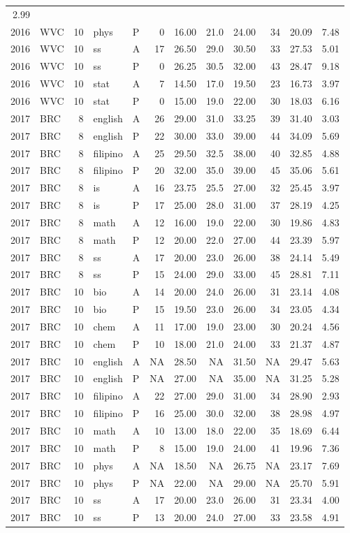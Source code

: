\documentclass[]{article}
\begin{document}
\begin{longtable}[]{@{}rlrllrrrrrrr@{}}
2.99\tabularnewline
2016 & WVC & 10 & phys & P & 0 & 16.00 & 21.0 & 24.00 & 34 & 20.09 &
7.48\tabularnewline
2016 & WVC & 10 & ss & A & 17 & 26.50 & 29.0 & 30.50 & 33 & 27.53 &
5.01\tabularnewline
2016 & WVC & 10 & ss & P & 0 & 26.25 & 30.5 & 32.00 & 43 & 28.47 &
9.18\tabularnewline
2016 & WVC & 10 & stat & A & 7 & 14.50 & 17.0 & 19.50 & 23 & 16.73 &
3.97\tabularnewline
2016 & WVC & 10 & stat & P & 0 & 15.00 & 19.0 & 22.00 & 30 & 18.03 &
6.16\tabularnewline
2017 & BRC & 8 & english & A & 26 & 29.00 & 31.0 & 33.25 & 39 & 31.40 &
3.03\tabularnewline
2017 & BRC & 8 & english & P & 22 & 30.00 & 33.0 & 39.00 & 44 & 34.09 &
5.69\tabularnewline
2017 & BRC & 8 & filipino & A & 25 & 29.50 & 32.5 & 38.00 & 40 & 32.85 &
4.88\tabularnewline
2017 & BRC & 8 & filipino & P & 20 & 32.00 & 35.0 & 39.00 & 45 & 35.06 &
5.61\tabularnewline
2017 & BRC & 8 & is & A & 16 & 23.75 & 25.5 & 27.00 & 32 & 25.45 &
3.97\tabularnewline
2017 & BRC & 8 & is & P & 17 & 25.00 & 28.0 & 31.00 & 37 & 28.19 &
4.25\tabularnewline
2017 & BRC & 8 & math & A & 12 & 16.00 & 19.0 & 22.00 & 30 & 19.86 &
4.83\tabularnewline
2017 & BRC & 8 & math & P & 12 & 20.00 & 22.0 & 27.00 & 44 & 23.39 &
5.97\tabularnewline
2017 & BRC & 8 & ss & A & 17 & 20.00 & 23.0 & 26.00 & 38 & 24.14 &
5.49\tabularnewline
2017 & BRC & 8 & ss & P & 15 & 24.00 & 29.0 & 33.00 & 45 & 28.81 &
7.11\tabularnewline
2017 & BRC & 10 & bio & A & 14 & 20.00 & 24.0 & 26.00 & 31 & 23.14 &
4.08\tabularnewline
2017 & BRC & 10 & bio & P & 15 & 19.50 & 23.0 & 26.00 & 34 & 23.05 &
4.34\tabularnewline
2017 & BRC & 10 & chem & A & 11 & 17.00 & 19.0 & 23.00 & 30 & 20.24 &
4.56\tabularnewline
2017 & BRC & 10 & chem & P & 10 & 18.00 & 21.0 & 24.00 & 33 & 21.37 &
4.87\tabularnewline
2017 & BRC & 10 & english & A & NA & 28.50 & NA & 31.50 & NA & 29.47 &
5.63\tabularnewline
2017 & BRC & 10 & english & P & NA & 27.00 & NA & 35.00 & NA & 31.25 &
5.28\tabularnewline
2017 & BRC & 10 & filipino & A & 22 & 27.00 & 29.0 & 31.00 & 34 & 28.90
& 2.93\tabularnewline
2017 & BRC & 10 & filipino & P & 16 & 25.00 & 30.0 & 32.00 & 38 & 28.98
& 4.97\tabularnewline
2017 & BRC & 10 & math & A & 10 & 13.00 & 18.0 & 22.00 & 35 & 18.69 &
6.44\tabularnewline
2017 & BRC & 10 & math & P & 8 & 15.00 & 19.0 & 24.00 & 41 & 19.96 &
7.36\tabularnewline
2017 & BRC & 10 & phys & A & NA & 18.50 & NA & 26.75 & NA & 23.17 &
7.69\tabularnewline
2017 & BRC & 10 & phys & P & NA & 22.00 & NA & 29.00 & NA & 25.70 &
5.91\tabularnewline
2017 & BRC & 10 & ss & A & 17 & 20.00 & 23.0 & 26.00 & 31 & 23.34 &
4.00\tabularnewline
2017 & BRC & 10 & ss & P & 13 & 20.00 & 24.0 & 27.00 & 33 & 23.58 &
4.91\tabularnewline

\end{longtable}
\end{document}
